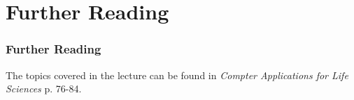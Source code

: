 \documentclass[12pt]{beamer}
\begin{document}
\section{Further Reading}
	\begin{frame}
		\frametitle{Further Reading}
		The topics covered in the lecture can be found in \textit{Compter Applications for Life Sciences} p. 76-84.
	\end{frame}
	
\end{document}
